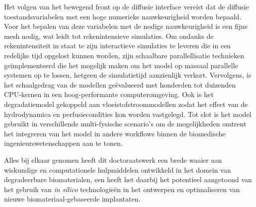 Het volgen van het bewegend front op de diffusie interface vereist dat de diffusie toestandsvariabelen met een hoge numerieke nauwkeurigheid worden bepaald. Voor het bepalen van deze variabelen met de nodige nauwkeurigheid is een fijne mesh nodig, wat leidt tot rekenintensieve simulaties. Om ondanks de rekenintensiteit in staat te zijn interactieve simulaties te leveren die in een redelijke tijd opgelost kunnen worden, zijn schaalbare parallellisatie technieken geïmplementeerd die het mogelijk maken om het model op massaal parallelle systemen op te lossen, hetgeen de simulatietijd aanzienlijk verkort. Vervolgens, is het schaalgedrag van de modellen geëvalueerd met honderden tot duizenden CPU-kernen in een hoog-performante computeromgeving. Ook is het degradatiemodel gekoppeld aan vloeistofstroommodellen zodat het effect van de hydrodynamica en perfusiecondities kon worden vastgelegd. Tot slot is het model gebruikt in verschillende multi-fysische scenario's om de mogelijkheden omtrent het integreren van het model in andere workflows binnen de biomedische ingenieurswetenschappen aan te tonen. 

Alles bij elkaar genomen heeft dit doctoraatswerk een brede waaier aan wiskundige en computationele hulpmiddelen ontwikkeld in het domein van degradeerbare biomaterialen, een heeft het daarbij het potentieel aangetoond van het gebruik van \textit{in silico} technologieën in het ontwerpen en optimaliseren van nieuwe biomateriaal-gebaseerde implantaten.


\cleardoublepage

